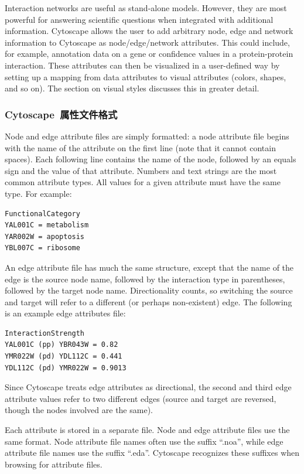 Interaction networks are useful as stand-alone models. However, they are most powerful for answering scientific questions when integrated with additional information. Cytoscape allows the user to add arbitrary node, edge and network information to Cytoscape as node/edge/network attributes. This could include, for example, annotation data on a gene or confidence values in a protein-protein interaction. These attributes can then be visualized in a user-defined way by setting up a mapping from data attributes to visual attributes (colors, shapes, and so on). The section on  visual styles discusses this in greater detail. 

\subsubsection{Cytoscape~属性文件格式}
 Node and edge attribute files are simply formatted: a node attribute file begins with the name of the attribute on the first line (note that it cannot contain spaces). Each following line contains the name of the node, followed by an equals sign and the value of that attribute. Numbers and text strings are the most common attribute types. All values for a given attribute must have the same type. For example: 

 \begin{verbatim}
FunctionalCategory
YAL001C = metabolism
YAR002W = apoptosis
YBL007C = ribosome
\end{verbatim}

 An edge attribute file has much the same structure, except that the name of the edge is the source node name, followed by the interaction type in parentheses, followed by the target node name. Directionality counts, so switching the source and target will refer to a different (or perhaps non-existent) edge. The following is an example edge attributes file: 

 \begin{verbatim}
InteractionStrength
YAL001C (pp) YBR043W = 0.82
YMR022W (pd) YDL112C = 0.441
YDL112C (pd) YMR022W = 0.9013
\end{verbatim}

 Since Cytoscape treats edge attributes as directional, the second and third edge attribute values refer to two different edges (source and target are reversed, though the nodes involved are the same). 

 Each attribute is stored in a separate file. Node and edge attribute files use the same format. Node attribute file names often use the suffix ``.noa'', while edge attribute file names use the suffix ``.eda''. Cytoscape recognizes these suffixes when browsing for attribute files. 

